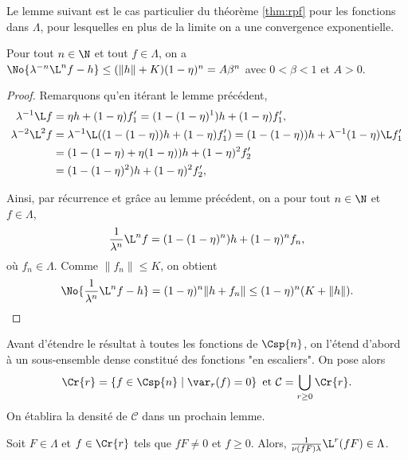   Le lemme suivant est le cas particulier du théorème \ref{thm:rpf} pour les fonctions dans $\Lambda$, pour lesquelles en plus de la limite
  on a une convergence exponentielle.

  \begin{lemma}
    \label{lem:conv_expo}
    \leanok
    Pour tout $n \in \N$ et tout $f\in\Lambda$, on a $\No{\lambda^{-n}\L^nf - h} \leq (\lVert h\rVert + K)(1 - \eta)^n = A\beta^n$
    avec $0 < \beta < 1$ et $A > 0$.
  \end{lemma}

  \begin{proof}
    Remarquons qu'en itérant le lemme précédent,
    \begin{align*}
      \lambda^{-1}\L f   &= \eta h + (1 - \eta)f'_1 = (1 - (1 - \eta)^1)h + (1 - \eta)f_1', \vspace{1em}\\
      \lambda^{-2}\L^2 f &= \lambda^{-1}\L((1 - (1 - \eta))h + (1 - \eta)f'_1) = (1 - (1 - \eta))h + \lambda^{-1}(1 - \eta)\L f'_1 \\
			 &= (1 - (1 - \eta) + \eta(1 - \eta))h + (1 - \eta)^2f'_2 \\
		         &= (1 - (1 - \eta)^2)h + (1 - \eta)^2f'_2,
    \end{align*}

    Ainsi, par récurrence et grâce au lemme précédent, on a pour tout $n \in \N$ et $f \in \Lambda$,
    $$\frac 1 {\lambda^n}\L^n f = (1 - (1 - \eta)^n)h + (1 - \eta)^nf_n,$$
    où $f_n \in \Lambda$. Comme $\lVert f_n\rVert \leq K$, on obtient
    $$\No{\frac 1 {\lambda^n}\L^n f - h} = (1-\eta)^n\lVert h + f_n\rVert \leq (1-\eta)^n(K + \lVert h\rVert).$$
  \end{proof}

  Avant d'étendre le résultat à toutes les fonctions de $\Csp{n}$, on l'étend d'abord à un sous-ensemble dense
  constitué des fonctions "en escaliers".
  On pose alors
  $$\Cr{r} = \left\{f \in \Csp{n} \mid \var_r(f) = 0 \right\} \text{ et } \mathcal C = \bigcup_{r\geq 0}{\Cr{r}}.$$
  On établira la densité de $\mathcal C$ dans un prochain lemme.

  \begin{lemma}
    \label{lem:Lambda_stb_mult_Cr}
    \leanok
    Soit $F \in \Lambda$ et $f \in \Cr{r}$ tels que $fF\not= 0$ et $f \geq 0$.
    Alors, $\frac{1}{\nu(fF)\lambda}\L^r(fF) \in \Lambda$.
  \end{lemma}

